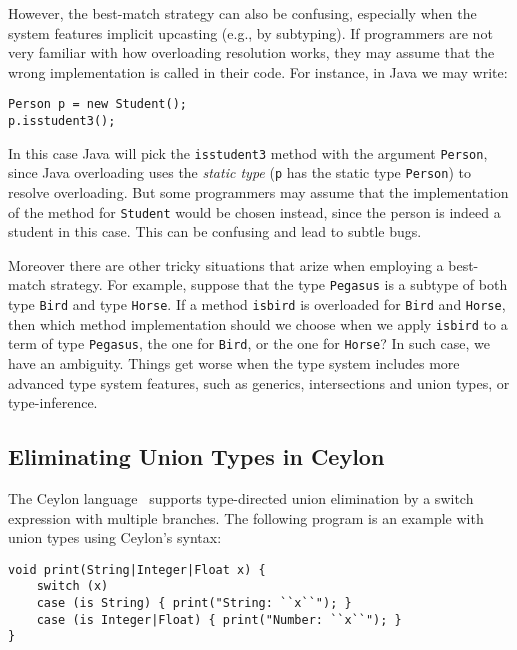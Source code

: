 However, the best-match strategy can also be confusing, especially when the
system features implicit upcasting (e.g., by subtyping). If programmers
are not very familiar with how overloading resolution works, they may assume
that the wrong implementation is called in their code. For instance, in Java
we may write:

\begin{lstlisting}
Person p = new Student();
p.isstudent3();
\end{lstlisting}

\noindent In this case Java will pick the \lstinline{isstudent3} method with the
argument \lstinline{Person}, since Java overloading uses the \emph{static type}
(\lstinline{p} has the static type \lstinline{Person})
to resolve overloading. But some programmers may assume that the implementation
of the method for \lstinline{Student} would be chosen instead, since the person
is indeed a student in this case. This can be confusing and lead to subtle bugs.

Moreover there are other tricky situations
that arize when employing a best-match strategy. For example, suppose
that the type \lstinline{Pegasus} is a subtype of both type \lstinline{Bird} and type
\lstinline{Horse}. If a method \lstinline{isbird} is overloaded for
\lstinline{Bird} and \lstinline{Horse}, then which method implementation should
we choose when we apply \lstinline{isbird} to a term of type
\lstinline{Pegasus}, the one for \lstinline{Bird}, or the one for
\lstinline{Horse}? In such case, we have an ambiguity. Things get worse
when the type system includes more advanced type system features, such as generics,
intersections and union types,
or type-inference.




\subsection{Eliminating Union Types in Ceylon}

The Ceylon language~\cite{king2013ceylon} supports type-directed union elimination by a
switch expression with multiple branches. The following program is an example
with union types using Ceylon's syntax:

\begin{lstlisting}
void print(String|Integer|Float x) {
	switch (x)
	case (is String) { print("String: ``x``"); }
	case (is Integer|Float) { print("Number: ``x``"); }
}
\end{lstlisting}
%

